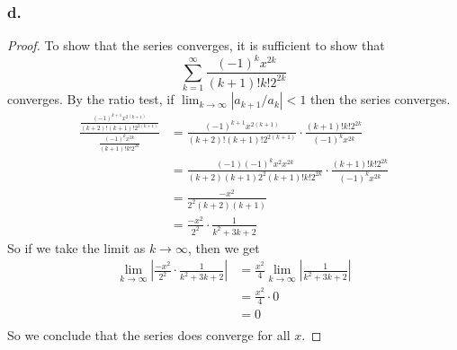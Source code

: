 \documentclass{article}
\theoremstyle{definition}
\begin{document}
    \subsubsection*{d.}
    \begin{proof}
        To show that the series converges, it is sufficient to show that 
        \[
        \sum_{k=1}^{\infty} \frac{(-1)^k x^{2k}}{(k+1)!k! 2^{2k}} 

        \] 
        converges. By the ratio test, if $\lim_{k\to \infty}|a_{k+1}/a_k| < 1$ then the series converges.
        \begin{align*}
            \frac{
            \frac{(-1)^{k+1} x^{2(k+1)}}{(k+2)!(k+1)! 2^{2(k+1)}} 
            }{
            \frac{(-1)^k x^{2k}}{(k+1)!k! 2^{2k}} 
            } &=  \frac{(-1)^{k+1} x^{2(k+1)}}{(k+2)!(k+1)! 2^{2(k+1)}} 
            \cdot \frac{(k+1)!k! 2^{2k}}{(-1)^k x^{2k}} \\
            &= \frac{(-1)(-1)^k x^2 x^{2k}}{(k+2)(k+1)2^2(k+1)!k!2^{2k}} 
            \cdot \frac{(k+1)!k! 2^{2k}}{(-1)^k x^{2k}}\\
            &= \frac{-x^2}{2^2(k+2)(k+1)} \\
            &= \frac{-x^2}{2^2} \cdot \frac{1}{k^2 + 3k + 2}
        \end{align*}
        So if we take the limit as $k \to \infty$, then we get 
        \begin{align*}
            \lim_{k\to \infty} \left|\frac{-x^2}{2^2} \cdot \frac{1}{k^2 + 3k + 2} \right|&= \frac{x^2}{4} \lim_{k\to \infty}\left|\frac{1}{k^2 + 3k + 2}\right| \\
            &= \frac{x^2}{4} \cdot 0 \\
            &= 0  \\
        \end{align*}
        So we conclude that the series does converge for all $x$.
    \end{proof}
\pagebreak
\end{document}
